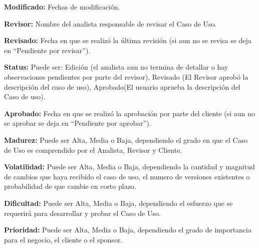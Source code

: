 \begin{Citemize}
	\item {\bf Modificado:} Fechas de modificación.
	\item {\bf Revisor:} Nombre del analista responsable de revisar el Caso de Uso.
	\item {\bf Revisado:} Fecha en que se realizó la última revisión (si aun no se revisa se deja en ``Pendiente por revisar'').
	\item {\bf Status:} Puede ser: Edición (el analista aun no termina de detallar o hay observaciones pendientes por parte del revisor), Revisado (El Revisor aprobó la descripción del caso de uso), Aprobado(El usuario aprueba la descripción del  Caso de uso).
	\item {\bf Aprobado:} Fecha en que se realizó la aprobación por parte del cliente (si aun no se aprobar se deja en ``Pendiente por aprobar'').
	\item {\bf Madurez:} Puede ser Alta, Media o Baja, dependiendo el grado en que el Caso de Uso es comprendido por el Analista, Revisor y Cliente.
	\item {\bf Volatilidad:} Puede ser Alta, Media o Baja, dependiendo la cantidad y magnitud de cambios que haya recibido el caso de uso, el numero de versiones existentes o probabilidad de que cambie en corto plazo.
	\item {\bf Dificultad:} Puede ser Alta, Media o Baja, dependiendo el esfuerzo que se requerirá para desarrollar y probar el Caso de Uso.
	\item {\bf Prioridad:} Puede ser Alta, Media o Baja, dependiendo el grado de importancia para el negocio, el cliente o el sponsor.
\end{Citemize}

